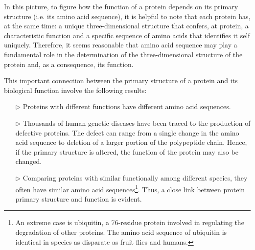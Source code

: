 In this picture, to figure how the function of a protein depends on its primary structure (i.e. its amino acid sequence), it is helpful to note that each protein has, at the same time: a unique three-dimensional structure that confers, at protein, a characteristic function and a specific sequence of amino acids that identifies it self uniquely.
Therefore, it seems reasonable that amino acid sequence may play a fundamental role in the determination of the three-dimensional structure of the protein and, as a consequence, its function. 

This important connection between the primary structure of a protein and its biological function involve the following results:
\begin{itemize}
\item[$\triangleright$] Proteins with different functions have different amino acid sequences. 
\item[$\triangleright$] Thousands of human genetic diseases have been traced to the production of defective proteins. The defect can range from a single change in the amino acid sequence to deletion of a larger portion of the polypeptide chain. Hence, if the primary structure is altered, the function of the protein may also be changed. 
\item[$\triangleright$] Comparing proteins with similar functionally among different species, they often have similar amino acid sequences\footnote{An extreme case is ubiquitin, a 76-residue protein involved in regulating the degradation of other proteins. The amino acid sequence of ubiquitin is identical in species as disparate as fruit flies and humans.}.
Thus, a close link between protein primary structure and function is evident.

\end{itemize}


